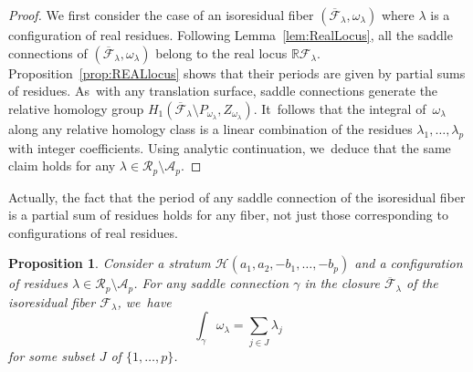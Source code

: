 \documentclass[11pt]{article}
\newtheorem{prop}[thm]{Proposition}
\theoremstyle{definition}
\begin{document}
\begin{proof}
We first consider the case of an isoresidual fiber $(\overline{\mathcal{F}}_{\lambda},\omega_{\lambda})$ where $\lambda$ is a configuration of real residues. Following Lemma~\ref{lem:RealLocus}, all the saddle connections of $(\overline{\mathcal{F}}_{\lambda},\omega_{\lambda})$ belong to the real locus $\mathbb{R}\mathcal{F}_{\lambda}$. Proposition~\ref{prop:REALlocus} shows that their periods are given by partial sums of residues. As~with any translation surface, saddle connections generate the relative homology group $H_{1}(\overline{\mathcal{F}}_{\lambda} \setminus P_{\omega_{\lambda}},Z_{\omega_{\lambda}})$. It~follows that the integral of~$\omega_{\lambda}$ along any relative homology class is a linear combination of the residues $\lambda_{1},\dots,\lambda_{p}$ with integer coefficients. Using analytic continuation, we~deduce that the same claim holds for any $\lambda \in \mathcal{R}_{p} \setminus \mathcal{A}_{p}$.
\end{proof}

Actually, the fact that the period of any saddle connection of the isoresidual fiber is a partial sum of residues holds for any fiber, not just those corresponding to configurations of real residues.

\begin{prop}\label{prop:SCperiod}
Consider a stratum $\mathcal{H}(a_{1},a_{2},-b_{1},\dots,-b_{p})$ and a configuration of residues
$\lambda \in \mathcal{R}_{p} \setminus \mathcal{A}_{p}$. For any saddle connection $\gamma$ in the closure $\overline{\mathcal{F}}_{\lambda}$ of the isoresidual fiber $\mathcal{F}_{\lambda}$, we~have\vspace*{-3pt}\enlargethispage{.5\baselineskip}
\[
\int_{\gamma} \omega_{\lambda} = \sum_{j \in J} \lambda_{j}
\]
for some subset $J$ of $\lbrace{ 1,\dots,p \rbrace}$.
\end{prop}
\end{document}
